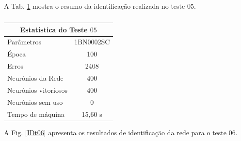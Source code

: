 A Tab. \ref{Estatistica do teste $05$} mostra o resumo da identificação realizada no teste $05$.

\begin{table}[H]
	\centering
	\caption{}
	\label{Estatistica do teste $05$}
	\begin{tabular}{@{}lc@{}}
		\toprule
		\multicolumn{2}{c}{Estatística do Teste $05$}         \\ \midrule
		Parâmetros                  & 1BN0002SC \\
		Época                       & 100       \\
		Erros                       & 2408       \\
		Neurônios da Rede           & 400       \\
		Neurônios vitoriosos        & 400       \\
		Neurônios sem uso           & 0         \\
		Tempo de máquina            & 15,60 s   \\ \bottomrule
	\end{tabular}
\end{table} 


A Fig. \ref{IDt06} apresenta os resultados de identificação da rede para o teste $06$.

